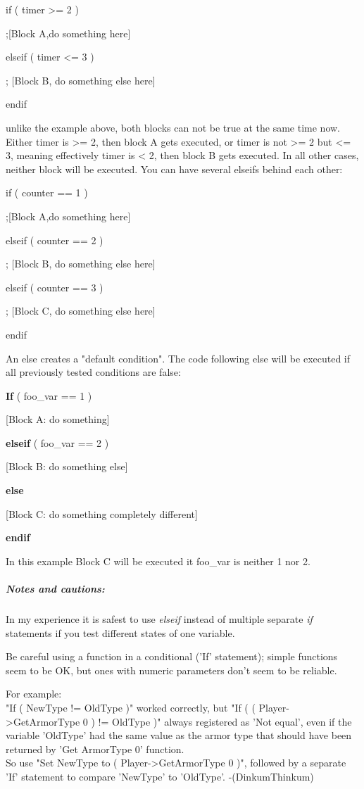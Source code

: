\documentclass[
]{article}
\begin{document}
if ( timer \textgreater= 2 )

;{[}Block A,do something here{]}

elseif ( timer \textless= 3 )

; {[}Block B, do something else here{]}

endif

unlike the example above, both blocks can not be true at the same time
now. Either timer is \textgreater= 2, then block A gets executed, or
timer is not \textgreater= 2 but \textless= 3, meaning effectively timer
is \textless{} 2, then block B gets executed. In all other cases,
neither block will be executed. You can have several elseifs behind each
other:

if ( counter == 1 )

;{[}Block A,do something here{]}

elseif ( counter == 2 )

; {[}Block B, do something else here{]}

elseif ( counter == 3 )

; {[}Block C, do something else here{]}

endif

An else creates a "default condition". The code following else will be
executed if all previously tested conditions are false:

\textbf{If} ( foo\_var == 1 )

{[}Block A: do something{]}

\textbf{elseif} ( foo\_var == 2 )

{[}Block B: do something else{]}

\textbf{else}

{[}Block C: do something completely different{]}

\textbf{endif}

In this example Block C will be executed it foo\_var is neither 1 nor 2.

\hypertarget{notes-and-cautions}{%
\subparagraph{Notes and cautions:}\label{notes-and-cautions}}

In my experience it is safest to use \emph{elseif} instead of multiple
separate \emph{if} statements if you test different states of one
variable.

Be careful using a function in a conditional ('If' statement); simple
functions seem to be OK, but ones with numeric parameters don't seem to
be reliable.

For example:\\
"If ( NewType != OldType )" worked correctly, but "If ( (
Player-\textgreater GetArmorType 0 ) != OldType )" always registered as
'Not equal', even if the variable 'OldType' had the same value as the
armor type that should have been returned by 'Get ArmorType 0'
function.\\
So use "Set NewType to ( Player-\textgreater GetArmorType 0 )", followed
by a separate 'If' statement to compare 'NewType' to 'OldType'.
-(DinkumThinkum)
\end{document}
